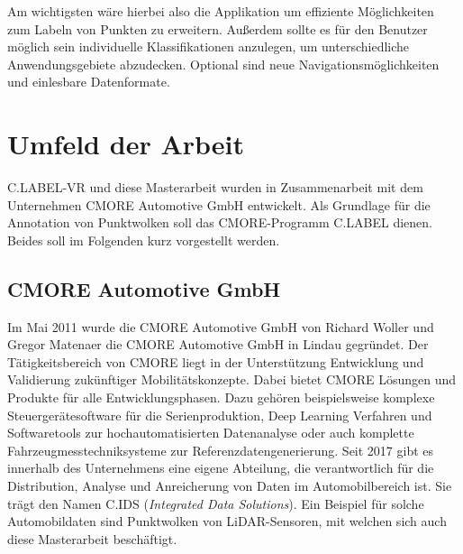 Am wichtigsten wäre hierbei also die Applikation um effiziente Möglichkeiten zum Labeln von Punkten zu erweitern. Außerdem sollte es für den Benutzer möglich sein individuelle Klassifikationen anzulegen, um unterschiedliche Anwendungsgebiete abzudecken. Optional sind neue Navigationsmöglichkeiten und einlesbare Datenformate.

\section{Umfeld der Arbeit}
C.LABEL-VR und diese Masterarbeit wurden in Zusammenarbeit mit dem Unternehmen CMORE Automotive GmbH entwickelt. Als Grundlage für die Annotation von Punktwolken soll das CMORE-Programm C.LABEL dienen. Beides soll im Folgenden kurz vorgestellt werden. 

\subsection{CMORE Automotive GmbH}
\label{sec:CMORE}
Im Mai 2011 wurde die CMORE Automotive GmbH von Richard Woller und Gregor Matenaer die CMORE Automotive GmbH in Lindau gegründet. Der Tätigkeitsbereich von CMORE liegt in der Unterstützung Entwicklung und Validierung zukünftiger Mobilitätskonzepte. Dabei bietet CMORE Lösungen und Produkte für alle Entwicklungsphasen. Dazu gehören beispielsweise komplexe Steuergerätesoftware für die Serienproduktion, Deep Learning Verfahren und Softwaretools zur hochautomatisierten Datenanalyse oder auch komplette Fahrzeugmesstechniksysteme zur Referenzdatengenerierung. Seit 2017 gibt es innerhalb des Unternehmens eine eigene Abteilung, die verantwortlich für die Distribution, Analyse und Anreicherung von Daten im Automobilbereich ist. Sie trägt den Namen C.IDS (\textit{Integrated Data Solutions}). Ein Beispiel für solche Automobildaten sind Punktwolken von LiDAR-Sensoren, mit welchen sich auch diese Masterarbeit beschäftigt.     

